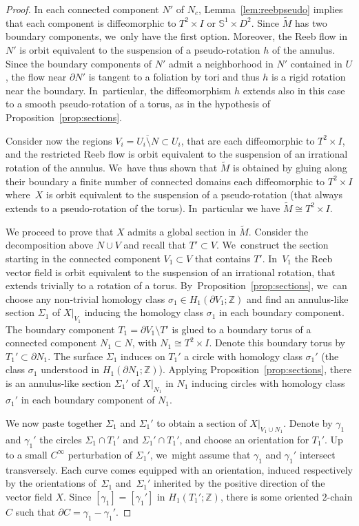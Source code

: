 \begin{proof}
In each connected component $N'$ of $N_c$, Lemma~\ref{lem:reebpseudo} implies that each component is diffeomorphic to $T^2\times I$ or $\mathbb{S}^1\times D^2$. Since $\widetilde M$ has two boundary components, we~only have the first option. Moreover, the Reeb flow in $N'$ is orbit equivalent to the suspension of a pseudo-rotation $h$ of the annulus. Since the boundary components of $N'$ admit a neighborhood in $N'$ contained in $U$, the flow near $\partial N'$ is tangent to a foliation by tori and thus $h$ is a rigid rotation near the boundary. In~particular, the diffeomorphism $h$ extends also in this case to a smooth pseudo-rotation of a torus, as in the hypothesis of Proposition~\ref{prop:sections}.

Consider now the regions $V_i=\overline{U_i\setminus N}\subset U_i$, that are each diffeomorphic to $T^2\times I$, and the restricted Reeb flow is orbit equivalent to the suspension of an irrational rotation of the annulus. We~have thus shown that $\widetilde{M}$ is obtained by gluing along their boundary a finite number of connected domains each diffeomorphic to $T^2\times I$ where~$X$ is orbit equivalent to the suspension of a pseudo-rotation (that always extends to a pseudo-rotation of the torus). In~particular we have $\widetilde{M}\cong T^2\times I$.

{We proceed to prove that $X$ admits a global section in $\widetilde M$.} Consider the decomposition above $N\cup V$ and recall that $T'\subset V$. We~construct the section starting in the connected component $V_1\subset V$ that contains $T'$. In~$V_1$ the Reeb vector field is orbit equivalent to the suspension of an irrational rotation, that extends trivially to a rotation of a torus. By~Proposition~\ref{prop:sections}, we~can choose any non-trivial homology class $\sigma_1 \in H_1(\partial V_1; \mathbb{Z})$ and find an annulus-like section $\Sigma_1$ of $X|_{V_1}$ inducing the homology class $\sigma_1$ in each boundary component. The boundary component $T_1=\partial V_1\setminus T'$ is glued to a boundary torus of a connected component $N_1\subset N$, with $N_1\cong T^2\times I$. Denote this boundary torus by $T_1'\subset \partial N_1$. The surface $\Sigma_1$ induces on $T_1'$ a circle with homology class $\sigma_1'$ (the class $\sigma_1$ understood in $H_1(\partial N_1;\mathbb{Z})$). Applying Proposition~\ref{prop:sections}, there is an annulus-like section $\Sigma_1'$ of $X|_{N_1}$ in $N_1$ inducing circles with homology class~$\sigma_1'$ in each boundary component of $N_1$.

We now paste together $\Sigma_1$ and $\Sigma_1'$ to obtain a section of $X|_{V_1\cup N_1}$. Denote by $\gamma_1$ and $\gamma_1'$ the circles $\Sigma_1\cap T_1'$ and $\Sigma_1'\cap T_1'$, and choose an orientation for $T_1'$. Up to a small $C^\infty$ perturbation of $\Sigma_1'$, we~might assume that $\gamma_1$ and $\gamma_1'$ intersect transversely. Each curve comes equipped with an orientation, induced respectively by the orientations of~$\Sigma_1$ and~$\Sigma_1'$ inherited by the positive direction of the vector field $X$. Since $[\gamma_1]=[\gamma_1']$ in $H_1(T_1';\mathbb{Z})$, there is some oriented $2$-chain $C$ such that $\partial C=\gamma_1-\gamma_1'$.


\end{proof}
